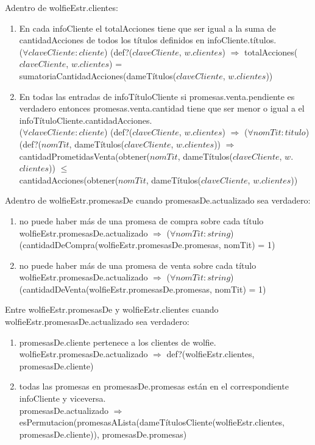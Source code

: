 \begin{Representacion}
\begin{enumerate}
 \end{enumerate}
\BlankLine
Adentro de wolfieEstr.clientes:
 \begin{enumerate}
 	\item En cada infoCliente el totalAcciones tiene que ser igual a la suma de cantidadAcciones de todos los títulos definidos en infoCliente.títulos.\\
    ($\forall claveCliente:cliente$) (def?($claveCliente$, $w$.$clientes$) $\Rightarrow$ totalAcciones($claveCliente$, $w$.$clientes$) = \\ sumatoriaCantidadAcciones(dameTítulos($claveCliente$, $w$.$clientes$))
    \item En todas las entradas de infoTítuloCliente si promesas.venta.pendiente es verdadero entonces promesas.venta.cantidad tiene que ser menor o igual a el infoTítuloCliente.cantidadAcciones.\\
($\forall claveCliente:cliente$) (def?($claveCliente$, $w$.$clientes$) $\Rightarrow$ ($\forall nomTit:titulo$)\\ (def?($nomTit$, dameTítulos($claveCliente$, $w$.$clientes$)) $\Rightarrow$\\ cantidadPrometidasVenta(obtener($nomTit$, dameTítulos($claveCliente$, $w$.$clientes$)) $\leq$\\cantidadAcciones(obtener($nomTit$, dameTítulos($claveCliente$, $w$.$clientes$))
 \end{enumerate}
 Adentro de wolfieEstr.promesasDe cuando promesasDe.actualizado sea verdadero:
 \begin{enumerate}
 	\item no puede haber más de una promesa de compra sobre cada título\\
    wolfieEstr.promesasDe.actualizado $\Rightarrow$ ($\forall nomTit:string$)\\ (cantidadDeCompra(wolfieEstr.promesasDe.promesas, nomTit) = 1)
    \item no puede haber más de una promesa de venta sobre cada título\\
    wolfieEstr.promesasDe.actualizado $\Rightarrow$ ($\forall nomTit:string$)\\(cantidadDeVenta(wolfieEstr.promesasDe.promesas, nomTit) = 1)
 \end{enumerate}

 Entre wolfieEstr.promesasDe y wolfieEstr.clientes cuando wolfieEstr.promesasDe.actualizado sea verdadero:
 \begin{enumerate}
 	\item promesasDe.cliente pertenece a los clientes de wolfie.\\
    wolfieEstr.promesasDe.actualizado $\Rightarrow$ def?(wolfieEstr.clientes, promesasDe.cliente) 
    \item todas las promesas en promesasDe.promesas están en el correspondiente infoCliente y viceversa.\\
promesasDe.actualizado $\Rightarrow$\\ esPermutacion(promesasALista(dameTítulosCliente(wolfieEstr.clientes, promesasDe.cliente)), promesasDe.promesas)
 \end{enumerate}


\end{Representacion}
